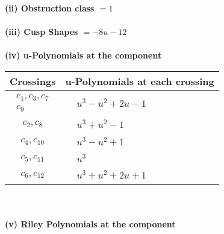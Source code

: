 \documentclass[1p]{elsarticle_modified}
\theoremstyle{definition}
\begin{document}
\flushleft \textbf{(ii) Obstruction class $= 1$}\\~\\
\flushleft \textbf{(iii) Cusp Shapes $= -8 u-12$}\\~\\
\newpage\renewcommand{\arraystretch}{1}
\flushleft \textbf{(iv) u-Polynomials at the component}\newline \\
\begin{tabular}{m{50pt}|m{274pt}}
Crossings & \hspace{64pt}u-Polynomials at each crossing \\
\hline $$\begin{aligned}c_{1},c_{3},c_{7}\\c_{9}\end{aligned}$$&$\begin{aligned}
&u^3- u^2+2 u-1
\end{aligned}$\\
\hline $$\begin{aligned}c_{2},c_{8}\end{aligned}$$&$\begin{aligned}
&u^3+u^2-1
\end{aligned}$\\
\hline $$\begin{aligned}c_{4},c_{10}\end{aligned}$$&$\begin{aligned}
&u^3- u^2+1
\end{aligned}$\\
\hline $$\begin{aligned}c_{5},c_{11}\end{aligned}$$&$\begin{aligned}
&u^3
\end{aligned}$\\
\hline $$\begin{aligned}c_{6},c_{12}\end{aligned}$$&$\begin{aligned}
&u^3+u^2+2 u+1
\end{aligned}$\\
\hline
\end{tabular}\\~\\
\newpage\renewcommand{\arraystretch}{1}
\flushleft \textbf{(v) Riley Polynomials at the component}\newline \\
\end{document}
